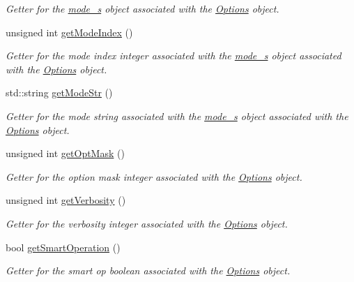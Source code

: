 \begin{DoxyCompactItemize}
\begin{DoxyCompactList}\small\item\em Getter for the \mbox{\hyperlink{structmode__s}{mode\+\_\+s}} object associated with the \mbox{\hyperlink{classOptions}{Options}} object. \end{DoxyCompactList}\item 
unsigned int \mbox{\hyperlink{classOptions_a3a9dd5c843239fb9b535e51e05eaae75}{get\+Mode\+Index}} ()
\begin{DoxyCompactList}\small\item\em Getter for the mode index integer associated with the \mbox{\hyperlink{structmode__s}{mode\+\_\+s}} object associated with the \mbox{\hyperlink{classOptions}{Options}} object. \end{DoxyCompactList}\item 
std\+::string \mbox{\hyperlink{classOptions_a61ee3094e1c27f99ba5d6af02c813f62}{get\+Mode\+Str}} ()
\begin{DoxyCompactList}\small\item\em Getter for the mode string associated with the \mbox{\hyperlink{structmode__s}{mode\+\_\+s}} object associated with the \mbox{\hyperlink{classOptions}{Options}} object. \end{DoxyCompactList}\item 
unsigned int \mbox{\hyperlink{classOptions_a5d6a001ae1d9cd7d4b9f9fa698c0b8ae}{get\+Opt\+Mask}} ()
\begin{DoxyCompactList}\small\item\em Getter for the option mask integer associated with the \mbox{\hyperlink{classOptions}{Options}} object. \end{DoxyCompactList}\item 
unsigned int \mbox{\hyperlink{classOptions_ac83d54ab2f7e5deb400e751014867d31}{get\+Verbosity}} ()
\begin{DoxyCompactList}\small\item\em Getter for the verbosity integer associated with the \mbox{\hyperlink{classOptions}{Options}} object. \end{DoxyCompactList}\item 
bool \mbox{\hyperlink{classOptions_a84ce0e1b99886d39ca63725c4f270e68}{get\+Smart\+Operation}} ()
\begin{DoxyCompactList}\small\item\em Getter for the smart op boolean associated with the \mbox{\hyperlink{classOptions}{Options}} object. \end{DoxyCompactList}\item 

\end{DoxyCompactItemize}
